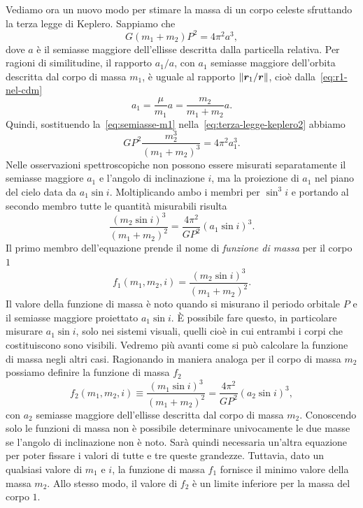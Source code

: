 Vediamo ora un nuovo modo per stimare la massa di un corpo celeste sfruttando la
terza legge di Keplero. Sappiamo che
\begin{equation}
  \label{eq:terza-legge-keplero2}
  G(m_1 + m_2)  P^2 = 4\pi^2a^3,
\end{equation}
dove $a$ è il semiasse maggiore dell'ellisse descritta dalla particella
relativa. Per ragioni di similitudine, il rapporto $a_1/a$, con $a_1$ semiasse
maggiore dell'orbita descritta dal corpo di massa $m_1$, è uguale al rapporto
$\lVert\bm{r}_1/\bm{r}\rVert$, cioè dalla~\eqref{eq:r1-nel-cdm}
\begin{equation}
  \label{eq:semiasse-m1}
  a_1 = \frac{\mu}{m_1}a = \frac{m_2}{m_1 + m_2}a.
\end{equation}
Quindi, sostituendo la~\eqref{eq:semiasse-m1}
nella~\eqref{eq:terza-legge-keplero2} abbiamo
\begin{equation}
  GP^2\frac{m_2^3}{(m_1 + m_2)^3} = 4\pi^2a_1^3.
\end{equation}
Nelle osservazioni spettroscopiche non possono essere misurati separatamente il
semiasse maggiore $a_1$ e l'angolo di inclinazione $i$, ma la proiezione di
$a_1$ nel piano del cielo data da $a_1\sin i$. Moltiplicando ambo i membri per
$\sin^3 i$ e portando al secondo membro tutte le quantità misurabili risulta
\begin{equation}
  \label{eq:valore-funzione-massa}
  \frac{(m_2\sin i)^3}{(m_1 + m_2)^2} = \frac{4\pi^2}{GP^2}(a_1\sin i)^3.
\end{equation}
Il primo membro dell'equazione prende il nome di \emph{funzione di massa} per il
corpo $1$
\begin{equation}
  f_1(m_1,m_2,i) = \frac{(m_2\sin i)^3}{(m_1 + m_2)^2}.
\end{equation}
Il valore della funzione di massa è noto quando si misurano il periodo orbitale
$P$ e il semiasse maggiore proiettato $a_1\sin i$. È possibile fare questo, in
particolare misurare $a_1\sin i$, solo nei sistemi visuali, quelli cioè in cui
entrambi i corpi che costituiscono sono visibili. Vedremo più avanti come si può
calcolare la funzione di massa negli altri casi. Ragionando in maniera analoga
per il corpo di massa $m_2$ possiamo definire la funzione di massa $f_2$
\begin{equation}
  f_2(m_1,m_2,i) \equiv \frac{(m_1\sin i)^3}{(m_1 + m_2)^2} =
  \frac{4\pi^2}{GP^2}(a_2\sin i)^3,
\end{equation}
con $a_2$ semiasse maggiore dell'ellisse descritta dal corpo di massa
$m_2$. Conoscendo solo le funzioni di massa non è possibile determinare
univocamente le due masse se l'angolo di inclinazione non è noto. Sarà quindi
necessaria un'altra equazione per poter fissare i valori di tutte e tre queste
grandezze. Tuttavia, dato un qualsiasi valore di $m_1$ e $i$, la funzione di
massa $f_1$ fornisce il minimo valore della massa $m_2$. Allo stesso modo, il
valore di $f_2$ è un limite inferiore per la massa del corpo $1$.

